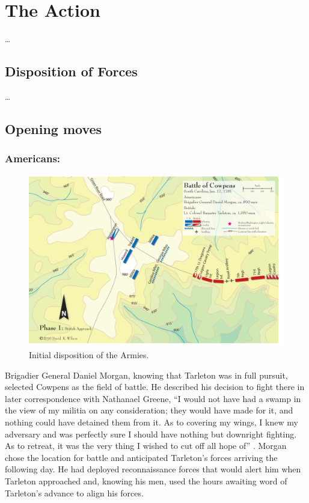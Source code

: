 \section{The Action}

\ldots

\subsection{Disposition of Forces}

\ldots

\subsection{Opening moves}

\subsubsection{Americans:}

\begin{figure}[h]
    \begin{center}
    \includegraphics[width=\textwidth]{gfx/beiber01}
    \end{center}
    \caption{Initial disposition of the Armies.\cite{wilson_blogmap}}
    \label{beiber01}
\end{figure}



Brigadier General Daniel Morgan, knowing that Tarleton was in full pursuit,
selected Cowpens as the field of battle.  He described his decision to fight
there in later correspondence with Nathanael Greene, “I would not have had a
swamp in the view of my militia on any consideration; they would have made for
it, and nothing could have detained them from it.  As to covering my wings, I
knew my adversary and was perfectly sure I should have nothing but downright
fighting.  As to retreat, it was the very thing I wished to cut off all hope of”
\cite[46]{moncure_cowpens_1996}.  Morgan chose the location for battle and anticipated
Tarleton's forces arriving the following day.  He had deployed reconnaissance
forces that would alert him when Tarleton approached and, knowing his men, used
the hours awaiting word of Tarleton's advance to align his forces.

